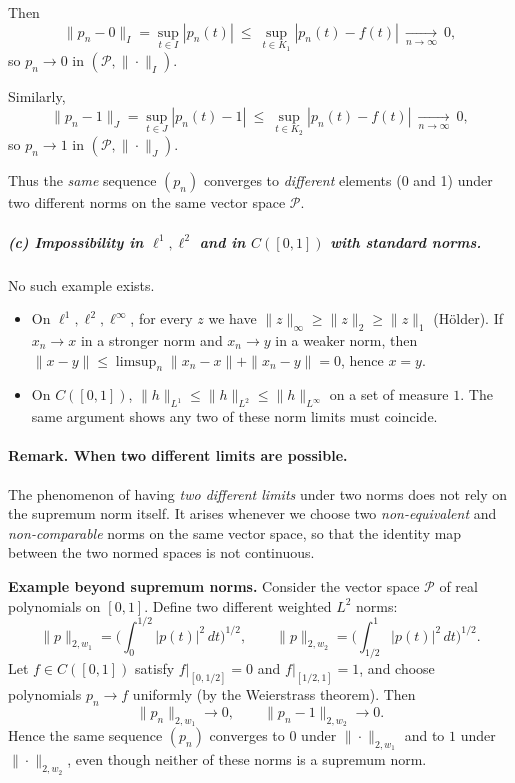 \documentclass[12pt,a4paper]{article}
\theoremstyle{plain}
\theoremstyle{definition}
\theoremstyle{remark}
\theoremstyle{remark}
\begin{document}
Then
\[
\|p_n-0\|_{I}=\sup_{t\in I}|p_n(t)|
\ \le\ \sup_{t\in K_1}|p_n(t)-f(t)|
\ \xrightarrow[n\to\infty]{}\ 0,
\]
so $p_n\to 0$ in $(\mathcal{P},\|\cdot\|_{I})$.

Similarly,
\[
\|p_n-1\|_{J}=\sup_{t\in J}|p_n(t)-1|
\ \le\ \sup_{t\in K_2}|p_n(t)-f(t)|
\ \xrightarrow[n\to\infty]{}\ 0,
\]
so $p_n\to 1$ in $(\mathcal{P},\|\cdot\|_{J})$.

\medskip
\noindent
Thus the \emph{same} sequence $(p_n)$ converges to \emph{different} elements (0 and 1) under two different norms on the same vector space $\mathcal{P}$.

\bigskip
\subparagraph{(c) Impossibility in $\ell^1,\ell^2$ and in $C([0,1])$ with standard norms.}
No such example exists.
\begin{itemize}
	\item On $\ell^1,\ell^2,\ell^\infty$, for every $z$ we have
	$\|z\|_\infty\ge \|z\|_2\ge \|z\|_1$ (Hölder).
	If $x_n\to x$ in a stronger norm and $x_n\to y$ in a weaker norm,
	then $\|x-y\|\le \limsup_n \|x_n-x\|+\|x_n-y\|=0$, hence $x=y$.
	\item On $C([0,1])$,
	$\|h\|_{L^1}\le \|h\|_{L^2}\le \|h\|_{L^\infty}$ on a set of measure $1$.
	The same argument shows any two of these norm limits must coincide.
\end{itemize}

\paragraph{Remark. When two different limits are possible.}

The phenomenon of having \emph{two different limits} under two norms does not rely on the supremum
norm itself. It arises whenever we choose two \emph{non-equivalent} and \emph{non-comparable} norms
on the same vector space, so that the identity map between the two normed spaces is not continuous.

\medskip
\noindent\textbf{Example beyond supremum norms.}
Consider the vector space $\mathcal{P}$ of real polynomials on $[0,1]$.
Define two different weighted $L^2$ norms:
\[
\|p\|_{2,w_1}=\Big(\int_0^{1/2}|p(t)|^2\,dt\Big)^{1/2},
\qquad
\|p\|_{2,w_2}=\Big(\int_{1/2}^{1}|p(t)|^2\,dt\Big)^{1/2}.
\]
Let $f\in C([0,1])$ satisfy $f|_{[0,1/2]}=0$ and $f|_{[1/2,1]}=1$,
and choose polynomials $p_n\to f$ uniformly (by the Weierstrass theorem).
Then
\[
\|p_n\|_{2,w_1}\to 0,
\qquad
\|p_n-1\|_{2,w_2}\to 0.
\]
Hence the same sequence $(p_n)$ converges to $0$ under $\|\cdot\|_{2,w_1}$
and to $1$ under $\|\cdot\|_{2,w_2}$,
even though neither of these norms is a supremum norm.
\end{document}
